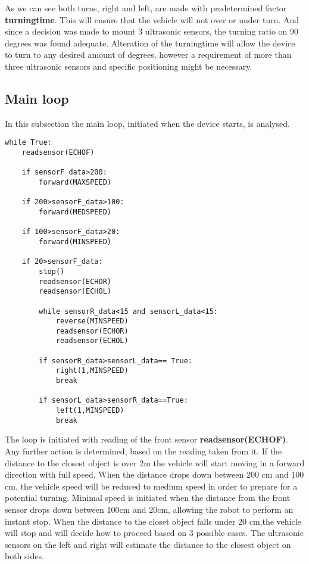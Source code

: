 As we can see both turns, right and left, are made with predetermined factor \textbf{turningtime}.
This will ensure that the vehicle will not over or under turn.
And since a decision was made to mount 3 ultrasonic sensors, the turning ratio on 90 degrees was found adequate.
Alteration of the turningtime will allow the device to turn to any desired amount of degrees, however a requirement of more than three ultrasonic sensors and specific positioning might be necessary.

\subsection{Main loop} \label{main_loop}

In this subsection the main loop, initiated when the device starts, is analysed.

\begin{lstlisting}
while True:
	readsensor(ECHOF)

	if sensorF_data>200:
		forward(MAXSPEED)
		
	if 200>sensorF_data>100:
		forward(MEDSPEED)

	if 100>sensorF_data>20:
		forward(MINSPEED)

	if 20>sensorF_data:
		stop()
		readsensor(ECHOR)
		readsensor(ECHOL)

		while sensorR_data<15 and sensorL_data<15:	
			reverse(MINSPEED)
			readsensor(ECHOR)
			readsensor(ECHOL)
			
		if sensorR_data>sensorL_data== True:
			right(1,MINSPEED)
			break
			
		if sensorL_data>sensorR_data==True:
			left(1,MINSPEED)
			break
\end{lstlisting}

The loop is initiated with reading of the front sensor \textbf{readsensor(ECHOF)}. Any further action is determined, based on the reading taken from it. If the distance to the closest object is over 2m the vehicle will start moving in a forward direction with full speed. When the distance drops down between 200 cm and 100 cm, the vehicle speed will be reduced to medium speed in order to prepare for a potential turning. Minimal speed is initiated when the distance from the front sensor drops down between 100cm and 20cm, allowing the robot to perform an instant stop. 
When the distance to the closet object falls under 20 cm,the vehicle will stop and will decide how to proceed based on 3 possible cases. The ultrasonic sensors on the left and right will estimate the distance to the closest object on both sides.

